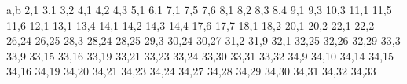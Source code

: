 a,b
2,1
3,1 
3,2
4,1 
4,2 
4,3
5,1
6,1
7,1 
7,5 
7,6
8,1 
8,2 
8,3 
8,4
9,1 
9,3
10,3
11,1 
11,5 
11,6
12,1
13,1 
13,4
14,1 
14,2 
14,3 
14,4
17,6 
17,7
18,1 
18,2
20,1 
20,2
22,1 
22,2
26,24 
26,25
28,3 
28,24 
28,25
29,3
30,24 
30,27
31,2
31,9
32,1 
32,25 
32,26 
32,29
33,3 
33,9 
33,15 
33,16 
33,19 
33,21 
33,23 
33,24 
33,30 
33,31 
33,32
34,9
34,10
34,14 
34,15 
34,16 
34,19 
34,20 
34,21 
34,23 
34,24 
34,27
34,28 
34,29 
34,30 
34,31 
34,32 
34,33